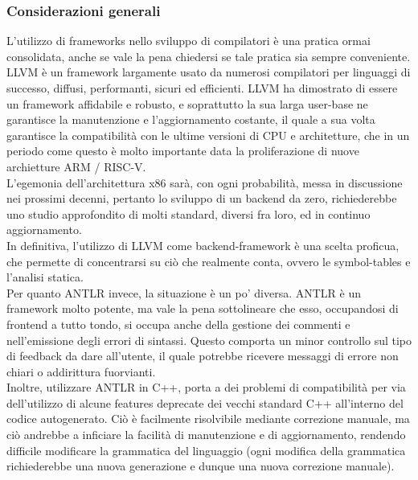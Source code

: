 \subsubsection{Considerazioni generali}
L'utilizzo di frameworks nello sviluppo di compilatori è una pratica ormai consolidata, anche se vale 
la pena chiedersi se tale pratica sia sempre conveniente. \\ 

LLVM è un framework largamente usato 
da numerosi compilatori per linguaggi di successo, diffusi, performanti, sicuri ed efficienti. LLVM ha 
dimostrato di essere un framework affidabile e robusto, e soprattutto la sua larga user-base ne garantisce
la manutenzione e l'aggiornamento costante, il quale a sua volta garantisce la compatibilità con le ultime
versioni di CPU e architetture, che in un periodo come questo è molto importante data la proliferazione di 
nuove archietture ARM / RISC-V. \\

L'egemonia dell'architettura x86 sarà, con ogni
probabilità, messa in discussione nei prossimi decenni, pertanto lo sviluppo di un backend da zero, richiederebbe
uno studio approfondito di molti standard, diversi fra loro, ed in continuo aggiornamento.  \\ 

In definitiva, l'utilizzo di LLVM come backend-framework è una scelta proficua, che permette di concentrarsi
su ciò che realmente conta, ovvero le symbol-tables e l'analisi statica. \\

Per quanto ANTLR invece, la situazione è un po' diversa. ANTLR è un framework molto potente, ma vale la pena 
sottolineare che esso, occupandosi di frontend a tutto tondo, si occupa anche della gestione dei commenti e nell'emissione
degli errori di sintassi. Questo comporta un minor controllo sul tipo di feedback da dare all'utente, il quale potrebbe
ricevere messaggi di errore non chiari o addirittura fuorvianti. \\

Inoltre, utilizzare ANTLR in C++, porta a dei problemi di compatibilità per via dell'utilizzo di alcune features 
deprecate dei vecchi standard C++ all'interno del codice autogenerato. Ciò è facilmente risolvibile mediante 
correzione manuale, ma ciò andrebbe a inficiare la facilità di manutenzione e di aggiornamento, rendendo difficile 
modificare la grammatica del linguaggio (ogni modifica della grammatica richiederebbe una nuova generazione 
e dunque una nuova correzione manuale). \\
